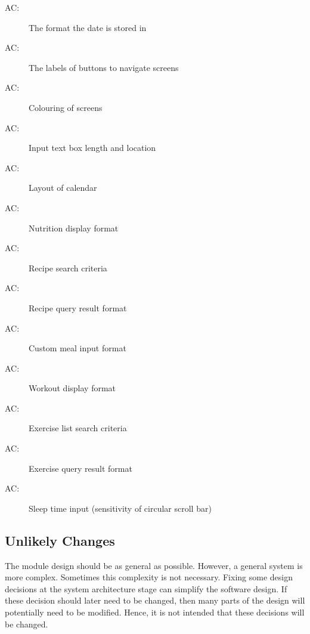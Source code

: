 \documentclass[12pt, titlepage]{article}
\newcounter{acnum}
\newcommand{\actheacnum}{AC\theacnum}
\begin{document}
\begin{description}
	\item[ \actheacnum \label{ac1}:] The format the date is stored in
	\item[ \actheacnum \label{ac2}:] The labels of buttons to navigate screens
	\item[ \actheacnum \label{ac3}:] Colouring of screens
	\item[ \actheacnum \label{ac4}:] Input text box length and location
	\item[ \actheacnum \label{ac5}:] Layout of calendar
	\item[ \actheacnum \label{ac6}:] Nutrition display format
	\item[ \actheacnum \label{ac7}:] Recipe search criteria
	\item[ \actheacnum \label{ac8}:] Recipe query result format
	\item[ \actheacnum \label{ac9}:] Custom meal input format
	\item[ \actheacnum \label{ac10}:] Workout display format
	\item[ \actheacnum \label{ac11}:] Exercise list search criteria
	\item[ \actheacnum \label{ac12}:] Exercise query result format
	\item[ \actheacnum \label{ac13}:] Sleep time input (sensitivity of circular scroll bar)
\end{description}

\subsection{Unlikely Changes} \label{SecUchange}

The module design should be as general as possible. However, a general system is
more complex. Sometimes this complexity is not necessary. Fixing some design
decisions at the system architecture stage can simplify the software design. If
these decision should later need to be changed, then many parts of the design
will potentially need to be modified. Hence, it is not intended that these
decisions will be changed.
\end{document}
